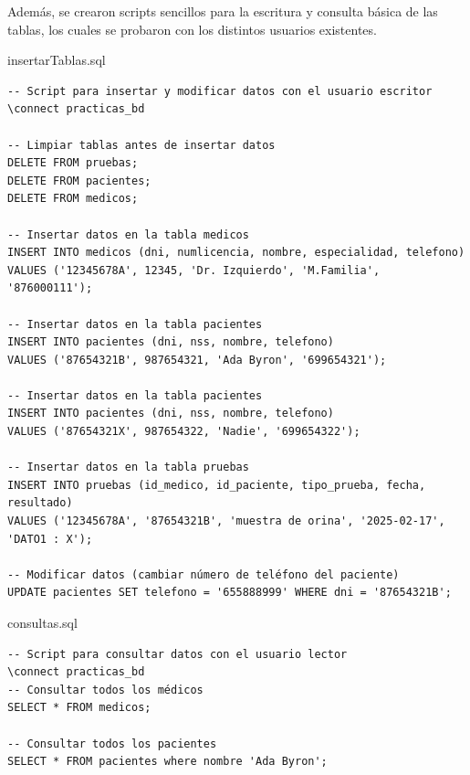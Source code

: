 \documentclass{article}
\begin{document}
Además, se crearon scripts sencillos para la escritura y consulta básica de las tablas, los cuales se probaron con los distintos usuarios existentes.
\begin{scriptbox}{insertarTablas.sql}
\begin{verbatim}
-- Script para insertar y modificar datos con el usuario escritor
\connect practicas_bd

-- Limpiar tablas antes de insertar datos
DELETE FROM pruebas;
DELETE FROM pacientes;
DELETE FROM medicos;

-- Insertar datos en la tabla medicos
INSERT INTO medicos (dni, numlicencia, nombre, especialidad, telefono)
VALUES ('12345678A', 12345, 'Dr. Izquierdo', 'M.Familia', '876000111');

-- Insertar datos en la tabla pacientes
INSERT INTO pacientes (dni, nss, nombre, telefono)
VALUES ('87654321B', 987654321, 'Ada Byron', '699654321');

-- Insertar datos en la tabla pacientes
INSERT INTO pacientes (dni, nss, nombre, telefono)
VALUES ('87654321X', 987654322, 'Nadie', '699654322');

-- Insertar datos en la tabla pruebas
INSERT INTO pruebas (id_medico, id_paciente, tipo_prueba, fecha, resultado)
VALUES ('12345678A', '87654321B', 'muestra de orina', '2025-02-17', 'DATO1 : X');

-- Modificar datos (cambiar número de teléfono del paciente)
UPDATE pacientes SET telefono = '655888999' WHERE dni = '87654321B';

\end{verbatim}
\end{scriptbox}

\begin{scriptbox}{consultas.sql}
\begin{verbatim}
-- Script para consultar datos con el usuario lector
\connect practicas_bd
-- Consultar todos los médicos
SELECT * FROM medicos;

-- Consultar todos los pacientes
SELECT * FROM pacientes where nombre 'Ada Byron';
\end{verbatim}
\end{scriptbox}
\end{document}
